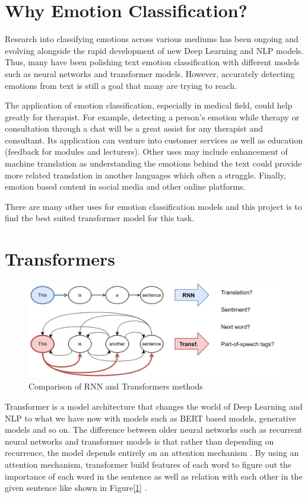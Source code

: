 \section{Why Emotion Classification?}
Research into classifying emotions across various mediums has been ongoing and evolving alongside the rapid development of new Deep Learning and NLP models. Thus, many have been polishing text emotion classification with different models such as neural networks and transformer models. However, accurately detecting emotions from text is still a goal that many are trying to reach.

The application of emotion classification, especially in medical field, could help greatly for therapist. For example, detecting a person's emotion while therapy or consultation through a chat will be a great assist for any therapist and consultant. Its application can venture into customer services as well as education (feedback for modules and lecturers)\cite{Amrullah_2023}. Other uses may include enhancement of machine translation as understanding the emotions behind the text could provide more related translation in another languages which often a struggle\cite{Amrullah_2023}. Finally, emotion based content in social media and other online platforms\cite{Amrullah_2023}. 

There are many other uses for emotion classification models and this project is to find the best suited transformer model for this task.

\section{Transformers}

\begin{figure}[ht]
    \centerline{\includegraphics[scale=0.17]{Figures/rnn-transf-nlp.jpg}}
    \caption{Comparison of RNN and Transformers methods}
    \label{fig:rnn-transf}
 \end{figure}

Transformer is a model architecture that changes the world of Deep Learning and NLP to what we have now with models such as BERT based models, generative models and so on. The difference between older neural networks such as recurrent neural networks and transformer models is that rather than depending on recurrence, the model depends entirely on an attention mechanism \cite{Vaswani_Shazeer_Parmar_Uszkoreit_Jones_Gomez_Kaiser_Polosukhin_2023}. By using an attention mechanism, transformer build features of each word to figure out the importance of each word in the sentence as well as relation with each other in the given sentence like shown in Figure[\ref{fig:rnn-transf}] \cite{Vaswani_Shazeer_Parmar_Uszkoreit_Jones_Gomez_Kaiser_Polosukhin_2023}.


